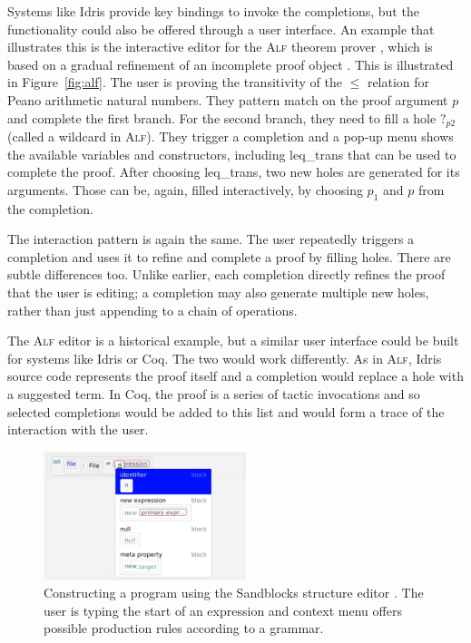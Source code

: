 \documentclass[anonymous, a4paper,UKenglish,cleveref, autoref, thm-restate]{lipics-v2021}
\newcommand{\ident}[1]{\textsf{#1}}
\begin{document}
Systems like Idris provide key bindings to invoke the completions, but the functionality could
also be offered through a user interface. An example that illustrates this is the interactive editor
for the \textsc{Alf} theorem prover \cite{magnusson-1994-alf}, which is based on a gradual refinement of
an incomplete proof object \cite{altenkirch-1994-alf}. This is illustrated in Figure~\ref{fig:alf}.
The user is proving the transitivity of the $\leq$ relation for Peano arithmetic natural numbers.
They pattern match on the proof argument $p$ and complete the first branch. For the second branch,
they need to fill a hole $?_{p2}$ (called a wildcard in \textsc{Alf}). They trigger a completion
and a pop-up menu shows the available variables and constructors, including \ident{leq\_trans} that
can be used to complete the proof. After choosing \ident{leq\_trans}, two new holes are generated
for its arguments. Those can be, again, filled interactively, by choosing $p_1$ and $p$ from the
completion.

The interaction pattern is again the same. The user repeatedly triggers a completion and uses
it to refine and complete a proof by filling holes. There are subtle differences too. Unlike
earlier, each completion directly refines the proof that the user is editing;
a completion may also generate multiple new holes, rather than just appending to a
chain of operations.

The \textsc{Alf} editor is a historical example, but a similar user interface could be built for
systems like Idris or Coq. The two would work differently. As in \textsc{Alf}, Idris source code
represents the proof itself and a completion would replace a hole with a suggested term. In Coq,
the proof is a series of tactic invocations and so selected completions would be added to this
list and would form a trace of the interaction with the user.

\begin{figure}[t]
  \vspace{-0.25em}
  \includegraphics[width=0.525\textwidth]{fig/sandblocks.png}
  \caption{Constructing a program using the Sandblocks structure editor \cite{beckmann-2023-all}.
    The user is typing the start of an expression and context menu offers possible production
    rules according to a grammar.}
  \label{fig:sand}
\end{figure}
\end{document}
